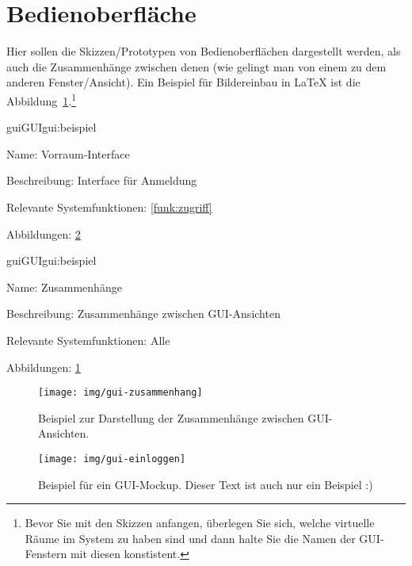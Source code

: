 
\section{Bedienoberfläche}

Hier sollen die Skizzen/Prototypen von Bedienoberflächen dargestellt werden, als auch die Zusammenhänge zwischen denen (wie gelingt man von einem zu dem anderen Fenster/Ansicht). Ein Beispiel für Bildereinbau in LaTeX ist die Abbildung~\ref{gui:zusammenhang}.\footnote{Bevor Sie mit den Skizzen anfangen, überlegen Sie sich, welche virtuelle Räume im System zu haben sind und dann halte Sie die Namen der GUI-Fenstern mit diesen konstistent.}

\setcounter{gui}{10}

\begin{description}[leftmargin=5em, style=sameline]	
	\begin{lhp}{gui}{GUI}{gui:beispiel}
		\item[Name:] Vorraum-Interface
		\item[Beschreibung:] Interface für Anmeldung
		\item[Relevante Systemfunktionen:] \ref{funk:zugriff}
		\item[Abbildungen:] \ref{gui:login}
	\end{lhp}
\end{description}

\begin{description}[leftmargin=5em, style=sameline]	
	\begin{lhp}{gui}{GUI}{gui:beispiel}
		\item[Name:] Zusammenhänge
		\item[Beschreibung:] Zusammenhänge zwischen GUI-Ansichten
		\item[Relevante Systemfunktionen:] Alle
		\item[Abbildungen:] \ref{gui:zusammenhang}
	\end{lhp}
\end{description}

\begin{figure}
	\centering
	\texttt{[image: img/gui-zusammenhang]}
	\caption{Beispiel zur Darstellung der Zusammenhänge zwischen GUI-Ansichten.}
	\label{gui:zusammenhang}
\end{figure}

\begin{figure}
	\centering
	\texttt{[image: img/gui-einloggen]}
	\caption{Beispiel für ein GUI-Mockup. Dieser Text ist auch nur ein Beispiel :)}
	\label{gui:login}
\end{figure}